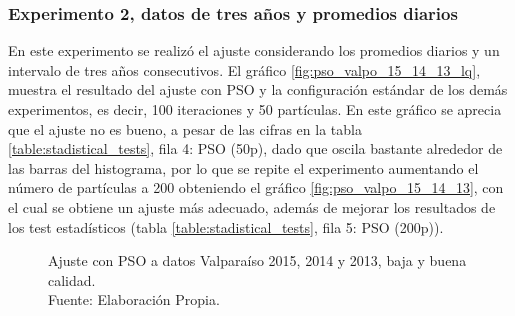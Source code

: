 \subsubsection{Experimento 2, datos de tres años y promedios diarios}
En este experimento se realizó el ajuste considerando los promedios diarios y un intervalo de tres años consecutivos. El gráfico \ref{fig:pso_valpo_15_14_13_lq}, muestra el resultado del ajuste con PSO y la configuración estándar de los demás experimentos, es decir, 100 iteraciones y 50 partículas. En este gráfico se aprecia que el ajuste no es bueno, a pesar de las cifras en la tabla \ref{table:stadistical_tests}, fila 4: PSO (50p), dado que oscila bastante alrededor de las barras del histograma, por lo que se repite el experimento aumentando el número de partículas a 200 obteniendo el gráfico \ref{fig:pso_valpo_15_14_13}, con el cual se obtiene un ajuste más adecuado, además de mejorar los resultados de los test estadísticos (tabla \ref{table:stadistical_tests}, fila 5: PSO (200p)).\\
\begin{figure}[ht!]
    \centering
    \captionsetup{justification=centering,margin=2cm}
    \caption{Ajuste con PSO a datos Valparaíso 2015, 2014 y 2013, baja y buena calidad.\\ Fuente: Elaboración Propia.}
    \label{fig:subfigures}
\end{figure}

